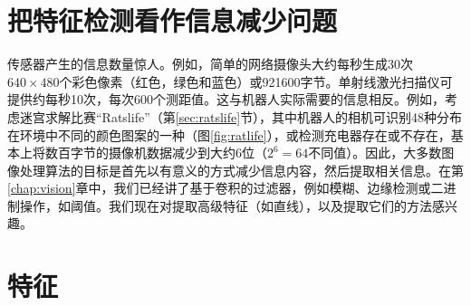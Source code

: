 
\section{把特征检测看作信息减少问题}

传感器产生的信息数量惊人。例如，简单的网络摄像头大约每秒生成30次$640\times 480$个彩色像素（红色，绿色和蓝色）或921600字节。单射线激光扫描仪可提供约每秒10次，每次600个测距值。这与机器人实际需要的信息相反。例如，考虑迷宫求解比赛“Ratslife”（第\ref{sec:ratslife}节），其中机器人的相机可识别48种分布在环境中不同的颜色图案的一种（图\ref{fig:ratlife}），或检测充电器存在或不存在，基本上将数百字节的摄像机数据减少到大约6位（$2^6=64$不同值）。因此，大多数图像处理算法的目标是首先以有意义的方式减少信息内容，然后提取相关信息。在第\ref{chap:vision}章中，我们已经讲了基于卷积的过滤器，例如模糊、边缘检测或二进制操作，如阈值。我们现在对提取高级特征（如直线），以及提取它们的方法感兴趣。


\section{特征}

